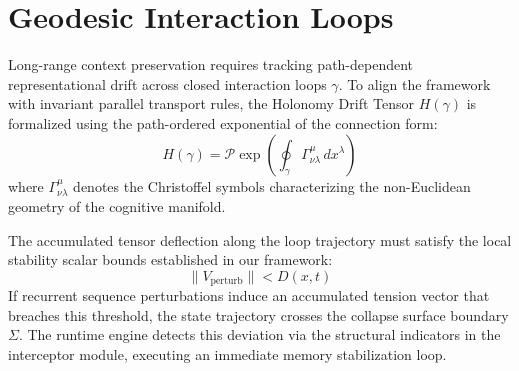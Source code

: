 \section{Geodesic Interaction Loops}
\label{sec:geodesic-loops}

Long-range context preservation
requires tracking path-dependent
representational drift across
closed interaction loops $\gamma$.
To align the framework with invariant
parallel transport rules, the
Holonomy Drift Tensor $H(\gamma)$
is formalized using the path-ordered
exponential of the connection form:
\[
H(\gamma) = \mathcal{P} \exp 
\left( \oint_{\gamma} 
\Gamma^\mu_{\nu \lambda} \, 
dx^\lambda \right)
\]
where $\Gamma^\mu_{\nu \lambda}$
denotes the Christoffel symbols
characterizing the non-Euclidean
geometry of the cognitive manifold.

The accumulated tensor deflection
along the loop trajectory must satisfy
the local stability scalar bounds
established in our framework:
\[
\| V_{\text{perturb}} \| < D(x,t)
\]
If recurrent sequence perturbations
induce an accumulated tension vector
that breaches this threshold, the
state trajectory crosses the collapse
surface boundary $\Sigma$. The runtime
engine detects this deviation via
the structural indicators in the
interceptor module, executing an
immediate memory stabilization loop.
